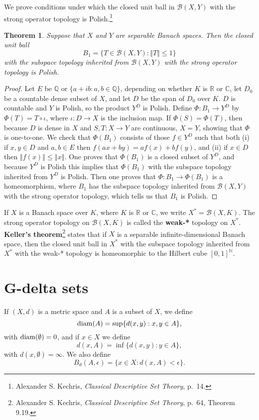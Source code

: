 \documentclass{article}
\newcommand{\diam}{\ensuremath\mathrm{diam}}
\newcommand{\norm}[1]{\left\Vert #1 \right\Vert}
\newtheorem{theorem}{Theorem}
\theoremstyle{definition}
\begin{document}
We  prove conditions under which the closed unit ball in $\mathscr{B}(X,Y)$ with the strong operator topology is Polish.\footnote{Alexander S. Kechris, {\em Classical Descriptive Set Theory}, p.~14.}
 
\begin{theorem}
Suppose that $X$ and $Y$ are separable Banach spaces. Then the closed unit ball
\[
B_1 = \{T \in \mathscr{B}(X,Y): \norm{T} \leq 1\}
\]
with the subspace topology inherited from $\mathscr{B}(X,Y)$ with the strong operator topology is Polish.
\end{theorem} 
\begin{proof}
Let $E$ be $\mathbb{Q}$ or $\{a+ib: a,b \in \mathbb{Q}\}$, depending on whether $K$ is $\mathbb{R}$ or $\mathbb{C}$,
 let $D_0$ be a countable dense subset of $X$, and let
$D$ be the span of $D_0$ over $K$. $D$ is countable and $Y$ is Polish, so the product $Y^D$ is Polish. 
Define $\Phi:B_1 \to Y^D$ by $\Phi(T) = T \circ \iota$, where $\iota:D \to X$ is the inclusion map. 
If $\Phi(S)=\Phi(T)$, then because $D$ is dense in $X$ and $S,T:X \to Y$ are continuous, $X=Y$, showing that $\Phi$ is one-to-one.
We check that
$\Phi(B_1)$ consists of those $f \in Y^D$ such that both (i) if $x,y \in D$ and $a,b \in E$ then $f(ax+by)=af(x)+bf(y)$, and (ii)
if $x \in D$ then $\norm{f(x)} \leq \norm{x}$. One proves that $\Phi(B_1)$ is a closed subset of $Y^D$, and because
$Y^D$ is Polish this implies that $\Phi(B_1)$ with the subspace topology inherited from $Y^D$ is Polish. Then one proves that $\Phi:B_1 \to \Phi(B_1)$ is a
homeomorphism, where $B_1$ has the subspace topology inherited from $\mathscr{B}(X,Y)$ with the strong operator
topology, which tells us that $B_1$ is Polish.
\end{proof}

If $X$ is a Banach space over $K$, where $K$ is $\mathbb{R}$ or $\mathbb{C}$, we write $X^*=\mathscr{B}(X,K)$. The strong
operator topology on $\mathscr{B}(X,K)$ is called the \textbf{weak-*} topology on $X^*$.
\textbf{Keller's theorem}\footnote{Alexander S. Kechris, {\em Classical Descriptive Set Theory}, p.~64, Theorem 9.19.}
 states that if $X$ is a separable infinite-dimensional Banach space, then the closed unit ball in $X^*$ with the subspace
topology inherited from $X^*$ with the weak-* topology is homeomorphic to the Hilbert cube $[0,1]^\mathbb{N}$.

\section{G-delta sets}
If $(X,d)$ is a metric space and $A$ is a subset of $X$, we define
\[
\diam(A) = \sup\{ d(x,y): x,y \in A\},
\]
with $\diam(\emptyset)=0$, and if $x \in X$ we define
\[
d(x,A) = \inf\{d(x,y): y \in A\},
\]
with $d(x,\emptyset)=\infty$. 
We also define
\[
B_d(A,\epsilon) = \{x \in X: d(x,A)<\epsilon\}.
\]
\end{document}
